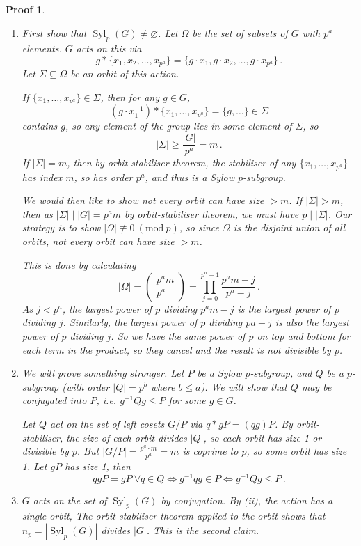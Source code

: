 \documentclass{article}
\theoremstyle{plain}\theoremheaderfont{\normalfont\itshape}\theorembodyfont{\rmfamily}\theoremseparator{.}\newtheorem*{rem}{Remark}\newtheorem*{ex}{Example}\newtheorem*{proof}{Proof}\newtheorem*{altp}{Alternative proof}\newtheorem*{nonex}{Non-Example}
\theoremstyle{plain}\theoremheaderfont{\normalfont\bfseries}\theorembodyfont{\rmfamily}\theoremseparator{.}\newtheorem{thm}{Theorem}[section]\newtheorem{lem}[thm]{Lemma}\newtheorem{prop}[thm]{Proposition}\newtheorem*{cor}{Corollary}\newtheorem{defn}[thm]{Definition}\newtheorem{clm}[thm]{Claim}\newtheorem{clminproof}{Claim}\newtheorem*{notn}{Notation}\newtheorem*{exer}{Exercise}\newtheorem*{lemnn}{Lemma}
\theoremstyle{break}\theoremheaderfont{\normalfont\itshape}\theorembodyfont{\rmfamily}\theoremseparator{.\medskip}\newtheorem*{proofskip}{Proof}\newtheorem*{exs}{Examples}\newtheorem*{rems}{Remarks}\newtheorem*{obs}{Observations}
\theoremstyle{break}\theoremheaderfont{\normalfont\bfseries}\theorembodyfont{\rmfamily}\theoremseparator{.\medskip}\newtheorem{lemskip}[thm]{Lemma}\newtheorem{defnskip}[thm]{Definition}\newtheorem{propskip}[thm]{Proposition}\newtheorem{thmskip}[thm]{Theorem}
\numberwithin{equation}{section}
\newcommand{\abs}[1]{\left|#1\right|}
\DeclareMathOperator{\Syl}{Syl}
\newcommand{\MOD}[1]{\ (\mathrm{mod} \ #1)}
\begin{document}
    \begin{proofskip}
        \begin{enumerate}[topsep=0pt,label=(\roman*)]
            \item First show that \(\Syl_p(G)\ne\varnothing\). Let \(\Omega\) be the set of subsets of \(G\) with \(p^a\) elements. \(G\) acts on this via
            \[g*\{x_1,x_2,\dots,x_{p^a}\}=\{g\cdot x_1,g\cdot x_2,\dots,g\cdot x_{p^a}\}\,.\]
            Let \(\Sigma\subseteq\Omega\) be an orbit of this action.

            If \(\{x_1,\dots,x_{p^a}\}\in\Sigma\), then for any \(g\in G\),
            \[(g\cdot x_1^{-1})*\{x_1,\dots,x_{p^a}\}=\{g,\dots\}\in\Sigma\]
            contains \(g\), so any element of the group lies in some element of \(\Sigma\), so
            \[\abs{\Sigma}\ge\frac{\abs{G}}{p^a}=m\,.\]
            If \(\abs{\Sigma}=m\), then by orbit-stabiliser theorem, the stabiliser of any \(\{x_1,\dots,x_{p^a}\}\) has index \(m\), so has order \(p^a\), and thus is a Sylow \(p\)-subgroup.

            We would then like to show not every orbit can have size \(>m\). If \(\abs{\Sigma}>m\), then as \(\abs{\Sigma}\mid\abs{G}=p^am\) by orbit-stabiliser theorem, we must have \(p\mid\abs{\Sigma}\). Our strategy is to show \(\abs{\Omega}\not\equiv 0\MOD{p}\), so since \(\Omega\) is the disjoint union of all orbits, not every orbit can have size \(>m\).

            This is done by calculating
            \[\abs{\Omega}=\begin{pmatrix}
                p^a m \\ p^a
            \end{pmatrix}=\prod_{j=0}^{p^a-1}\frac{p^a m-j}{p^a -j}\,.\]
            As \(j<p^a\), the largest power of \(p\) dividing \(p^a m-j\) is the largest power of \(p\) dividing \(j\). Similarly, the largest power of \(p\) dividing \(pa-j\) is also the largest power of \(p\) dividing \(j\). So we have the same power of \(p\) on top and bottom for each term in the product, so they cancel and the result is not divisible by \(p\).
            \item We will prove something stronger. Let \(P\) be a Sylow \(p\)-subgroup, and \(Q\) be a \(p\)-subgroup (with order \(\abs{Q}=p^b\) where \(b\le a\)). We will show that \(Q\) may be conjugated into \(P\), i.e. \(g^{-1}Qg\le P\) for some \(g\in G\).
            
            Let \(Q\) act on the set of left cosets \(G/P\) via \(q*gP=(qg)P\). By orbit-stabiliser, the size of each orbit divides \(\abs{Q}\), so each orbit has size 1 or divisible by \(p\). But \(\abs{G/P}=\frac{p^a\cdot m}{p^a}=m\) is coprime to \(p\), so some orbit has size 1. Let \(gP\) has size 1, then
            \[qgP=gP\ \forall q\in Q\iff g^{-1}qg\in P\iff g^{-1}Qg\le P\,.\]
            \item \(G\) acts on the set of \(\Syl_p(G)\) by conjugation. By (ii), the action has a single orbit, The orbit-stabiliser theorem applied to the orbit shows that \(n_p=\abs{\Syl_p(G)}\) divides \(\abs{G}\). This is the second claim.
            

\end{enumerate}
\end{proofskip}
\end{document}
